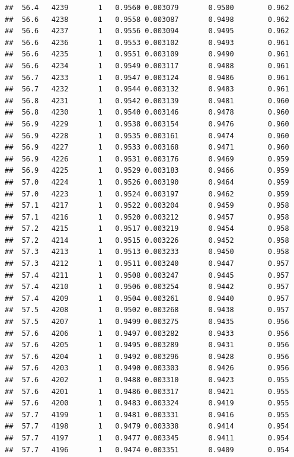 \documentclass[
]{book}
\begin{document}
\begin{verbatim}
##  56.4   4239       1   0.9560 0.003079       0.9500        0.962
##  56.6   4238       1   0.9558 0.003087       0.9498        0.962
##  56.6   4237       1   0.9556 0.003094       0.9495        0.962
##  56.6   4236       1   0.9553 0.003102       0.9493        0.961
##  56.6   4235       1   0.9551 0.003109       0.9490        0.961
##  56.6   4234       1   0.9549 0.003117       0.9488        0.961
##  56.7   4233       1   0.9547 0.003124       0.9486        0.961
##  56.7   4232       1   0.9544 0.003132       0.9483        0.961
##  56.8   4231       1   0.9542 0.003139       0.9481        0.960
##  56.8   4230       1   0.9540 0.003146       0.9478        0.960
##  56.9   4229       1   0.9538 0.003154       0.9476        0.960
##  56.9   4228       1   0.9535 0.003161       0.9474        0.960
##  56.9   4227       1   0.9533 0.003168       0.9471        0.960
##  56.9   4226       1   0.9531 0.003176       0.9469        0.959
##  56.9   4225       1   0.9529 0.003183       0.9466        0.959
##  57.0   4224       1   0.9526 0.003190       0.9464        0.959
##  57.0   4223       1   0.9524 0.003197       0.9462        0.959
##  57.1   4217       1   0.9522 0.003204       0.9459        0.958
##  57.1   4216       1   0.9520 0.003212       0.9457        0.958
##  57.2   4215       1   0.9517 0.003219       0.9454        0.958
##  57.2   4214       1   0.9515 0.003226       0.9452        0.958
##  57.3   4213       1   0.9513 0.003233       0.9450        0.958
##  57.3   4212       1   0.9511 0.003240       0.9447        0.957
##  57.4   4211       1   0.9508 0.003247       0.9445        0.957
##  57.4   4210       1   0.9506 0.003254       0.9442        0.957
##  57.4   4209       1   0.9504 0.003261       0.9440        0.957
##  57.5   4208       1   0.9502 0.003268       0.9438        0.957
##  57.5   4207       1   0.9499 0.003275       0.9435        0.956
##  57.6   4206       1   0.9497 0.003282       0.9433        0.956
##  57.6   4205       1   0.9495 0.003289       0.9431        0.956
##  57.6   4204       1   0.9492 0.003296       0.9428        0.956
##  57.6   4203       1   0.9490 0.003303       0.9426        0.956
##  57.6   4202       1   0.9488 0.003310       0.9423        0.955
##  57.6   4201       1   0.9486 0.003317       0.9421        0.955
##  57.6   4200       1   0.9483 0.003324       0.9419        0.955
##  57.7   4199       1   0.9481 0.003331       0.9416        0.955
##  57.7   4198       1   0.9479 0.003338       0.9414        0.954
##  57.7   4197       1   0.9477 0.003345       0.9411        0.954
##  57.7   4196       1   0.9474 0.003351       0.9409        0.954

\end{verbatim}
\end{document}
